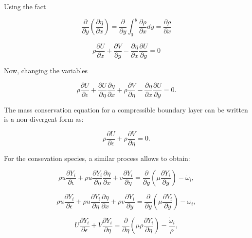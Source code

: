 Using the fact 

\begin{equation*} 
\frac{\partial}{\partial y}
\left(
    \frac{\partial \eta}{\partial x }
\right)
=
\frac{\partial}{\partial y}
    \int_0^y
    \frac{\partial \rho}{\partial x}
    dy
    =
    \frac{\partial \rho}{\partial x}
\end{equation*} 

\begin{equation} 
\rho
\frac{\partial  U}{\partial x}
+
\frac{\partial V}{\partial y}
-
\frac{\partial \eta}{\partial x }
\frac{\partial U}{\partial y}
=
0
\end{equation} 

Now,  changing the variables 

\begin{equation} 
\rho
\frac{\partial  U}{\partial \epsilon}
+
\frac{\partial  U}{\partial \eta}
\frac{\partial  \eta}{\partial x}
+
\rho
\frac{\partial V}{\partial \eta}
-
\frac{\partial \eta}{\partial x }
\frac{\partial U}{\partial y}
=
0
.
\end{equation} 

The mass conservation equation for a compressible boundary 
layer can be written is a non-divergent form as:

\begin{equation} 
\rho 
\frac{\partial U}{\partial \epsilon}
+
\rho
\frac{\partial V}{\partial \eta}
=
0
.
\end{equation} 

For the consevation species, a similar process 
allows to obtain: 

\begin{equation} 
\rho u\frac{\partial Y_{i}}{\partial \epsilon}
+
\rho u\frac{\partial Y_{i}}{\partial \eta}
\frac{\partial \eta}{\partial  x}
+
v\frac{\partial Y_{i}}{\partial \eta}
=
\frac{\partial}{\partial y}
\left(\mu \frac{\partial Y_i}{\partial y}\right)
-
\dot{\omega}_i
,
\end{equation} 

\begin{equation} 
\rho u\frac{\partial Y_{i}}{\partial \epsilon}
+
\rho u\frac{\partial Y_{i}}{\partial \eta}
\frac{\partial \eta}{\partial  x}
+
\rho v
\frac{\partial Y_{i}}{\partial y}
=
\frac{\partial}{\partial y}
\left(\mu \frac{\partial Y_i}{\partial y}\right)
-
\dot{\omega}_i
,
\end{equation} 

\begin{equation} 
U
\frac{\partial Y_{i}}{\partial \epsilon}
+
V
\frac{\partial Y_{i}}{\partial \eta}
=
\frac{\partial}{\partial \eta}
\left(\mu\rho \frac{\partial Y_i}{\partial \eta}\right)
-
\frac{\dot{\omega}_i}{\rho}
,
\end{equation} 

